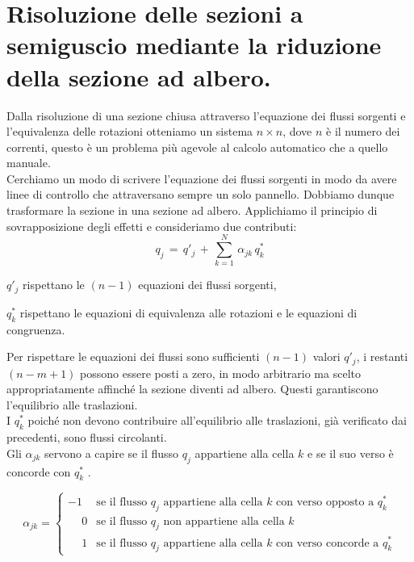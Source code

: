 \section{Risoluzione delle sezioni a semiguscio mediante la riduzione della sezione ad albero.}

Dalla risoluzione di una sezione chiusa attraverso l'equazione dei flussi sorgenti e l'equivalenza delle rotazioni otteniamo un sistema $n\times n$, dove $n$ è il numero dei correnti, questo è un problema più agevole al calcolo automatico che a quello manuale.\\
Cerchiamo un modo di scrivere l'equazione dei flussi sorgenti in modo da avere linee di controllo che attraversano sempre un solo pannello. Dobbiamo dunque trasformare la sezione in una sezione ad albero. Applichiamo il principio di sovrapposizione degli effetti e consideriamo due contributi:
\begin{equation*}
    q_j\,=\,q'_j\,+\,   \sum^N_{k=1}\,\alpha_{jk}\,q^*_k
\end{equation*}
\begin{compactitem}
    \item $q'_j$ rispettano le $(n-1)$ equazioni dei flussi sorgenti,\\
    \item  $q^*_k$ rispettano le equazioni di equivalenza alle rotazioni e le equazioni di congruenza.
\end{compactitem}

Per rispettare le equazioni dei flussi sono sufficienti $(n-1)$ valori $q'_j$, i restanti $(n-m+1)$ possono essere posti a zero, in modo arbitrario ma scelto appropriatamente affinché la sezione diventi ad albero. Questi garantiscono l'equilibrio alle traslazioni.\\
I $q^*_k$ poiché non devono contribuire all'equilibrio alle traslazioni, già verificato dai precedenti, sono flussi circolanti.\\
Gli $\alpha_{jk}$ servono a capire se il flusso $q_j$ appartiene alla cella $k$ e se il suo verso è concorde con $q^*_k$ .


\begin{equation*}
    \alpha_{jk} = \begin{cases}
        -1 & \text{se il flusso } q_j \text{ appartiene alla cella } k \text{ con verso opposto a } q^*_k \\
        \phantom{-}0 & \text{se il flusso } q_j \text{ non appartiene alla cella } k \\
        \phantom{-}1 & \text{se il flusso } q_j \text{ appartiene alla cella } k \text{ con verso concorde a } q^*_k
    \end{cases}
\end{equation*}


